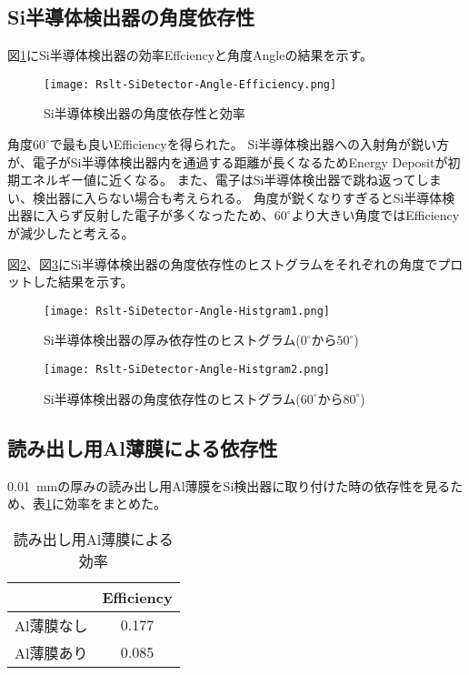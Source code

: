 \documentclass[a4paper,10pt]{jreport}
\begin{document}
\subsection{Si半導体検出器の角度依存性}

図\ref{Rslt-SiDetector-Angle-Efficiency}にSi半導体検出器の効率Effciencyと角度Angleの結果を示す。
	
\begin{figure}[H]
	\center
	\texttt{[image: Rslt-SiDetector-Angle-Efficiency.png]}
	\caption{Si半導体検出器の角度依存性と効率} \label{Rslt-SiDetector-Angle-Efficiency}
\end{figure}

角度$60^{\circ}$で最も良いEfficiencyを得られた。
Si半導体検出器への入射角が鋭い方が、電子がSi半導体検出器内を通過する距離が長くなるためEnergy Depositが初期エネルギー値に近くなる。
また、電子はSi半導体検出器で跳ね返ってしまい、検出器に入らない場合も考えられる。
角度が鋭くなりすぎるとSi半導体検出器に入らず反射した電子が多くなったため、$60^{\circ}$より大きい角度ではEfficiencyが減少したと考える。

図\ref{Rslt-SiDetector-Angle-Histgram1}、図\ref{Rslt-SiDetector-Angle-Histgram2}にSi半導体検出器の角度依存性のヒストグラムをそれぞれの角度でプロットした結果を示す。

\begin{figure}[H]
	\center
	\texttt{[image: Rslt-SiDetector-Angle-Histgram1.png]}
	\caption{Si半導体検出器の厚み依存性のヒストグラム($0^{\circ}$から$50^{\circ}$)} \label{Rslt-SiDetector-Angle-Histgram1}
\end{figure}

\begin{figure}[H]
	\center
	\texttt{[image: Rslt-SiDetector-Angle-Histgram2.png]}
	\caption{Si半導体検出器の角度依存性のヒストグラム($60^{\circ}$から$80^{\circ}$)} \label{Rslt-SiDetector-Angle-Histgram2}
\end{figure}



\subsection{読み出し用Al薄膜による依存性}

\SI{0.01}{mm}の厚みの読み出し用Al薄膜をSi検出器に取り付けた時の依存性を見るため、表\ref{Tab-SiDetector-Film-Efficiency}に効率をまとめた。

\begin{table}[H] 
	\center
	\caption{読み出し用Al薄膜による効率} \label{Tab-SiDetector-Film-Efficiency}
	\begin{tabular}{cc}
		\hline
		 & Efficiency \\
		\hline
		Al薄膜なし & 0.177 \\
		Al薄膜あり & 0.085 \\
		\hline
	\end{tabular}
\end{table}
\end{document}
